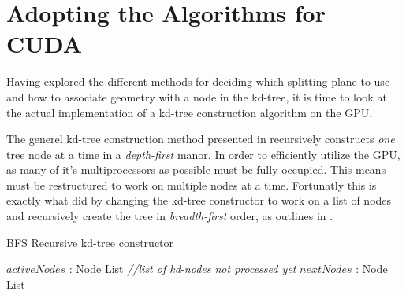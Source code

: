 \section{Adopting the Algorithms for CUDA}\label{sec:kdTreeImpl}


Having explored the different methods for deciding which splitting
plane to use and how to associate geometry with a node in the kd-tree,
it is time to look at the actual implementation of a kd-tree
construction algorithm on the GPU.

The generel kd-tree construction method presented in
 recursively constructs \textit{one} tree
node at a time in a \textit{depth-first} manor. In order to
efficiently utilize the GPU, as many of it's multiprocessors as
possible must be fully occupied. This means 
must be restructured to work on multiple nodes at a time. Fortunatly
this is exactly what \zhou{} did by changing the kd-tree constructor
to work on a list of nodes and recursively create the tree in
\textit{breadth-first} order, as outlines in
.

\begin{algorithm}
  \caption{BFS Recursive kd-tree constructor}
  \label{alg:bfsKDTreeCreator}
  \begin{algorithmic}
              {$activeNodes$ : Node List  \textit{\color{gray}//list of kd-nodes not processed yet}}
              {$nextNodes$ : Node List}
              {
                 \ELSE
                 \ENDIF
               \ENDFOR}
  \end{algorithmic}
\end{algorithm}

